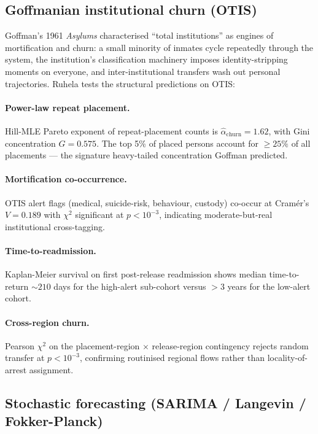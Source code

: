 \documentclass[11pt,a4paper]{article}
\newcommand{\1}{\mathbf{1}}
\theoremstyle{plain}
\theoremstyle{definition}
\begin{document}
\subsection{Goffmanian institutional churn (OTIS)}\label{sec:goffman}

Goffman's 1961 \emph{Asylums} \cite{goffman1961asylums}
characterised ``total institutions'' as engines of mortification
and churn: a small minority of inmates cycle repeatedly through the
system, the institution's classification machinery imposes
identity-stripping moments on everyone, and inter-institutional
transfers wash out personal trajectories.  Ruhela tests the structural
predictions on OTIS:

\paragraph{Power-law repeat placement.}
Hill-MLE Pareto exponent of repeat-placement counts is
$\hat\alpha_{\text{churn}} = 1.62$, with Gini concentration
$G=0.575$.  The top 5\% of placed persons account for $\ge 25\%$
of all placements — the signature heavy-tailed concentration
Goffman predicted.

\paragraph{Mortification co-occurrence.}
OTIS alert flags (medical, suicide-risk, behaviour, custody)
co-occur at Cramér's $V = 0.189$ with $\chi^2$ significant at
$p<10^{-3}$, indicating moderate-but-real institutional
cross-tagging.

\paragraph{Time-to-readmission.}
Kaplan-Meier survival on first post-release readmission shows
median time-to-return $\sim 210$ days for the high-alert sub-cohort
versus $>3$ years for the low-alert cohort.

\paragraph{Cross-region churn.}
Pearson $\chi^2$ on the placement-region $\times$ release-region
contingency rejects random transfer at $p<10^{-3}$, confirming
routinised regional flows rather than locality-of-arrest assignment.

\subsection{Stochastic forecasting (SARIMA / Langevin / Fokker-Planck)}\label{sec:forecasting}
\end{document}
